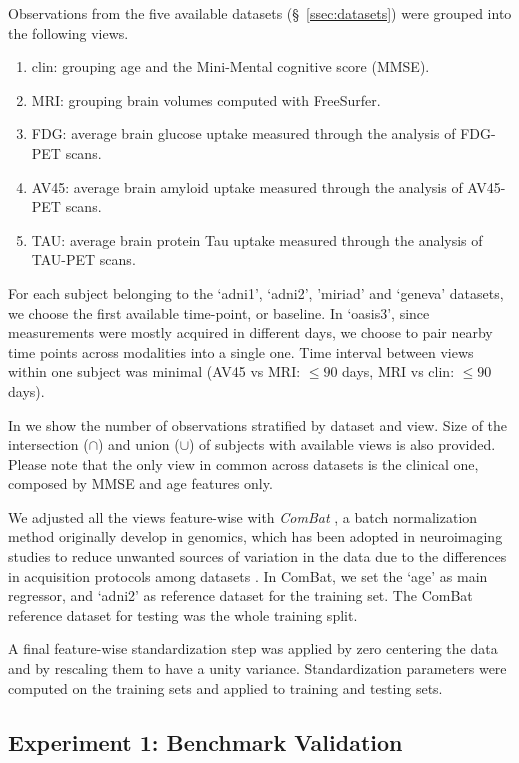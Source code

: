 Observations from the five available datasets (\S~\ref{ssec:datasets}) were grouped into the following views.
\begin{enumerate}
\item clin: grouping age and the Mini-Mental cognitive score (MMSE).
\item MRI: grouping brain volumes computed with FreeSurfer.
\item FDG: average brain glucose uptake measured through the analysis of FDG-PET scans.
\item AV45: average brain amyloid uptake measured through the analysis of AV45-PET scans.
\item TAU: average brain protein Tau uptake measured through the analysis of TAU-PET scans.
\end{enumerate}

For each subject belonging to the `adni1', `adni2', 'miriad' and `geneva' datasets, we choose the first available time-point, or baseline.
In `oasis3', since measurements were mostly acquired in different days, we choose to pair nearby time points across modalities into a single one.
Time interval between views within one subject was minimal (AV45 vs MRI: $\leq 90$ days, MRI vs clin: $\leq 90$ days).

In  we show the number of observations stratified by dataset and view.
Size of the intersection ($\cap$) and union ($\cup$) of subjects with available views is also provided.
Please note that the only view in common across datasets is the clinical one, composed by MMSE and age features only.

We adjusted all the views feature-wise with \textit{ComBat} \citep{combat}, a batch normalization method originally develop in genomics, which has been adopted in neuroimaging studies to reduce unwanted sources of variation in the data due to the differences in acquisition protocols among datasets \citep{Fortin2017, Fortin2018, Orlhac2020}.
In ComBat, we set the `age' as main regressor, and `adni2' as reference dataset for the training set.
The ComBat reference dataset for testing was the whole training split.

A final feature-wise standardization step was applied by zero centering the data and by rescaling them to have a unity variance.
Standardization parameters were computed on the training sets and applied to training and testing sets.

\subsection{Experiment 1: Benchmark Validation}


